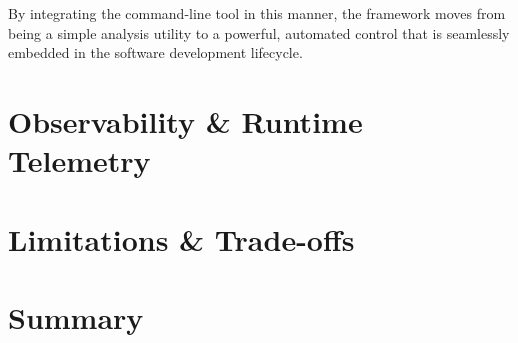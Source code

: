 By integrating the command-line tool in this manner, the framework moves from being a simple analysis utility to a powerful, automated control that is seamlessly embedded in the software development lifecycle.

\section{Observability \& Runtime Telemetry}

\section{Limitations \& Trade-offs}

\section{Summary}
